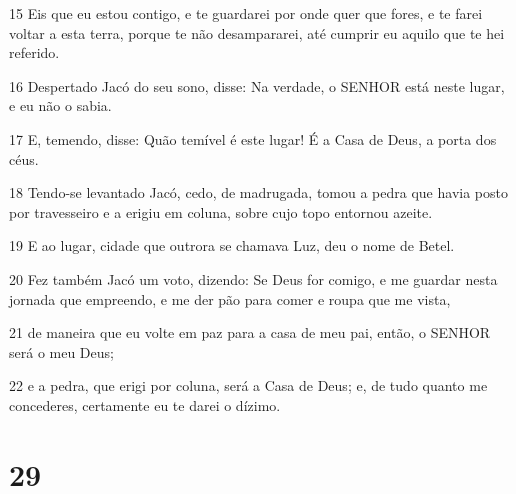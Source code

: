 \par 15 Eis que eu estou contigo, e te guardarei por onde quer que fores, e te farei voltar a esta terra, porque te não desampararei, até cumprir eu aquilo que te hei referido.
\par 16 Despertado Jacó do seu sono, disse: Na verdade, o SENHOR está neste lugar, e eu não o sabia.
\par 17 E, temendo, disse: Quão temível é este lugar! É a Casa de Deus, a porta dos céus.
\par 18 Tendo-se levantado Jacó, cedo, de madrugada, tomou a pedra que havia posto por travesseiro e a erigiu em coluna, sobre cujo topo entornou azeite.
\par 19 E ao lugar, cidade que outrora se chamava Luz, deu o nome de Betel.
\par 20 Fez também Jacó um voto, dizendo: Se Deus for comigo, e me guardar nesta jornada que empreendo, e me der pão para comer e roupa que me vista,
\par 21 de maneira que eu volte em paz para a casa de meu pai, então, o SENHOR será o meu Deus;
\par 22 e a pedra, que erigi por coluna, será a Casa de Deus; e, de tudo quanto me concederes, certamente eu te darei o dízimo.

\chapter{29}

